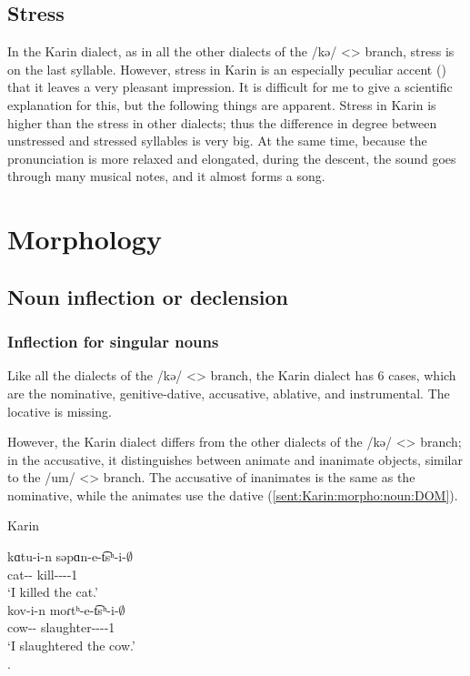 \subsection{Stress}

In the Karin dialect, as in all the other dialects of the /kə/ <> branch, stress is on the last syllable. However, stress in Karin is an especially peculiar accent () that it leaves a very pleasant impression. It is difficult for me to give a scientific explanation for this, but the following things are apparent. Stress in Karin is higher than the stress in other dialects; thus the difference in degree between unstressed and stressed syllables is very big. At the same time, because the pronunciation is more relaxed and elongated, during the descent, the sound goes through many musical notes, and it almost forms a song. 

\section{Morphology}
\subsection{Noun inflection or declension}

\subsubsection{Inflection for singular nouns}

Like all the dialects of the /kə/ <> branch, the Karin dialect has 6 cases, which are the nominative, genitive-dative, accusative, ablative, and instrumental. The locative is missing. 

However, the Karin dialect differs from the other dialects of the /kə/ <> branch; in the accusative, it distinguishes between animate and inanimate objects, similar to the /um/ <> branch. The accusative of inanimates is the same as the nominative, while the animates use the dative (\ref{sent:Karin:morpho:noun:DOM}). 


\begin{exe}
	\ex Karin \label{sent:Karin:morpho:noun:DOM}
	\begin{xlist}
		\ex \gll kɑtu-i-n səpɑn-e-t͡sʰ-i-$\emptyset$ \\ 
		cat-{\dat}-{} kill-{\thgloss}-{\aor}-{\pst}-1{\sg} \\
		\trans `I killed the cat.'\\
		\ex \gll kov-i-n moɾtʰ-e-t͡sʰ-i-$\emptyset$ \\ 
		cow-{\dat}-{} slaughter-{\thgloss}-{\aor}-{\pst}-1{\sg} \\
		\trans `I slaughtered the cow.'\\
		. 
	\end{xlist}
\end{exe}

